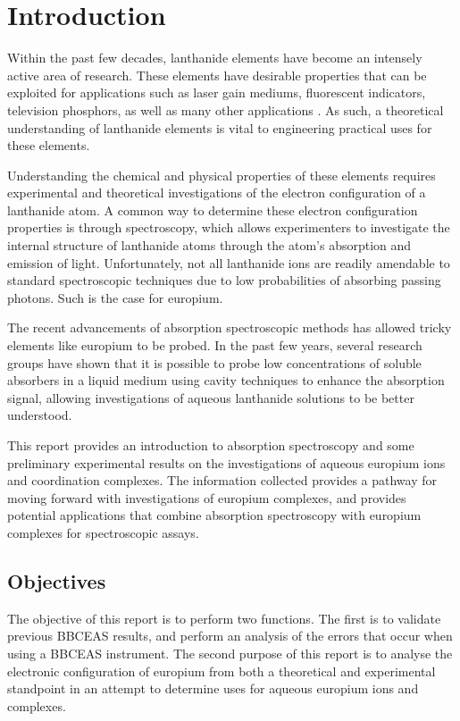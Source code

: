 \chapter*{Introduction}  \label{chap:intro}

Within the past few decades, lanthanide elements have become an intensely
active area of research. These elements have desirable properties that can be
exploited for applications such as laser gain mediums, fluorescent indicators,
television phosphors, as well as many other applications \cite{Bunzli:2005ic}.
As such, a theoretical understanding of lanthanide elements is vital to
engineering practical uses for these elements.

Understanding the chemical and physical properties of these elements requires
experimental and theoretical investigations of the electron configuration of
a lanthanide atom. A common way to determine these electron configuration
properties is through spectroscopy, which allows experimenters to investigate
the internal structure of lanthanide atoms through the atom's absorption
and emission of light. Unfortunately, not all lanthanide ions are readily
amendable to standard spectroscopic techniques due to low probabilities of
absorbing passing photons. Such is the case for europium.

The recent advancements of absorption spectroscopic methods has allowed tricky
elements like europium to be probed. In the past few years, several research
groups have shown that it is possible to probe low concentrations of soluble
absorbers in a liquid medium using cavity techniques to enhance the absorption
signal, allowing investigations of aqueous lanthanide solutions to be better
understood.

This report provides an introduction to absorption spectroscopy and some
preliminary experimental results on the investigations of aqueous europium ions
and coordination complexes. The information collected provides a pathway for
moving forward with investigations of europium complexes, and provides
potential applications that combine absorption spectroscopy with europium
complexes for spectroscopic assays.

\section*{Objectives}

The objective of this report is to perform two functions. The first is to
validate previous \ac{BBCEAS} results, and perform an analysis of the errors
that occur when using a \ac{BBCEAS} instrument. The second purpose of this
report is to analyse the electronic configuration of europium from both a
theoretical and experimental standpoint in an attempt to determine uses for
aqueous europium ions and complexes.

